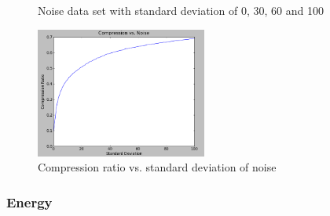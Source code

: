 \begin{figure}[ht]
\centering
{}
\hfill
{}
\hfill
{}
\hfill
{}
\caption{Noise data set with standard deviation of 0, 30, 60 and 100}
\label{fig:noiseset}
\end{figure}  

\begin{figure}
  \centering
  \includegraphics[width=0.50\textwidth]{figures/noiseall.png} 
  \caption{Compression ratio vs. standard deviation of noise}
  \label{fig:noiseall}
\end{figure}

\subsubsection{Energy}
